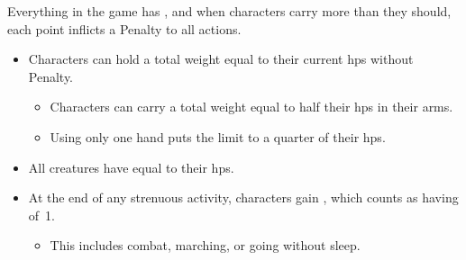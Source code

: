 
Everything in the game has , and when characters carry more than they should, each point inflicts a Penalty to all actions.

\begin{itemize}
  \item
  Characters can hold a total \gls{weight} equal to their current \glspl{hp} without Penalty.
  \begin{itemize}
  \item
  Characters can carry a total \gls{weight} equal to half their \glspl{hp} in their arms.
  \item
  Using only one hand puts the limit to a quarter of their \glspl{hp}.
  \end{itemize}
  \item
  All creatures have  equal to their \glspl{hp}.
  \item
  At the end of any strenuous activity, characters gain , which counts as having  of~1.
  \begin{itemize}
    \item
    This includes combat, marching, or going without sleep.
  \end{itemize}
\end{itemize}
